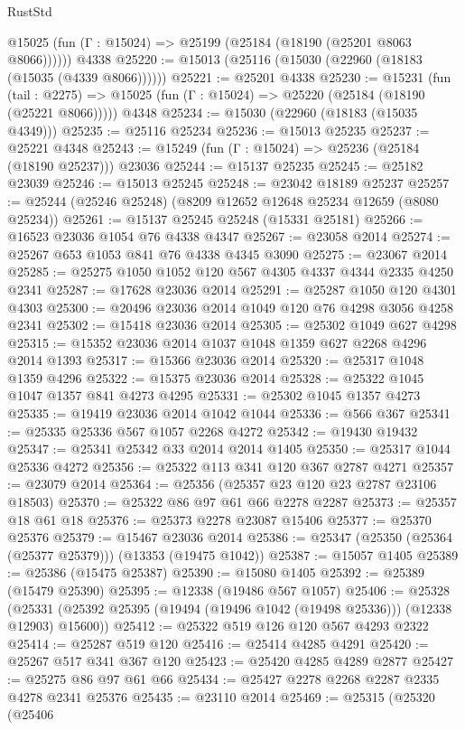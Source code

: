 \begin{lexlean}{RustStd}
\begin{coremodule}
      @15025 (fun (Γ : @15024) => @25199 (@25184 (@18190 (@25201 @8063 @8066))))))
    @4338
@25220 := @15013 (@25116 (@15030 (@22960 (@18183 (@15035 (@4339 @8066))))))
@25221 := @25201 @4338
@25230 := @15231
    (fun (tail : @2275) => @15025 (fun (Γ : @15024) => @25220 (@25184 (@18190 (@25221 @8066)))))
    @4348
@25234 := @15030 (@22960 (@18183 (@15035 @4349)))
@25235 := @25116 @25234
@25236 := @15013 @25235
@25237 := @25221 @4348
@25243 := @15249 (fun (Γ : @15024) => @25236 (@25184 (@18190 @25237))) @23036
@25244 := @15137 @25235
@25245 := @25182 @23039
@25246 := @15013 @25245
@25248 := @23042 @18189 @25237
@25257 := @25244 (@25246 @25248) (@8209 @12652 @12648 @25234 @12659 (@8080 @25234))
@25261 := @15137 @25245 @25248 (@15331 @25181)
@25266 := @16523 @23036 @1054 @76 @4338 @4347
@25267 := @23058 @2014
@25274 := @25267 @653 @1053 @841 @76 @4338 @4345 @3090
@25275 := @23067 @2014
@25285 := @25275 @1050 @1052 @120 @567 @4305 @4337 @4344 @2335 @4250 @2341
@25287 := @17628 @23036 @2014
@25291 := @25287 @1050 @120 @4301 @4303
@25300 := @20496 @23036 @2014 @1049 @120 @76 @4298 @3056 @4258 @2341
@25302 := @15418 @23036 @2014
@25305 := @25302 @1049 @627 @4298
@25315 := @15352 @23036 @2014 @1037 @1048 @1359 @627 @2268 @4296 @2014 @1393
@25317 := @15366 @23036 @2014
@25320 := @25317 @1048 @1359 @4296
@25322 := @15375 @23036 @2014
@25328 := @25322 @1045 @1047 @1357 @841 @4273 @4295
@25331 := @25302 @1045 @1357 @4273
@25335 := @19419 @23036 @2014 @1042 @1044
@25336 := @566 @367
@25341 := @25335 @25336 @567 @1057 @2268 @4272
@25342 := @19430 @19432
@25347 := @25341 @25342 @33 @2014 @2014 @1405
@25350 := @25317 @1044 @25336 @4272
@25356 := @25322 @113 @341 @120 @367 @2787 @4271
@25357 := @23079 @2014
@25364 := @25356 (@25357 @23 @120 @23 @2787 @23106 @18503)
@25370 := @25322 @86 @97 @61 @66 @2278 @2287
@25373 := @25357 @18 @61 @18
@25376 := @25373 @2278 @23087 @15406
@25377 := @25370 @25376
@25379 := @15467 @23036 @2014
@25386 := @25347 (@25350 (@25364 (@25377 @25379))) (@13353 (@19475 @1042))
@25387 := @15057 @1405
@25389 := @25386 (@15475 @25387)
@25390 := @15080 @1405
@25392 := @25389 (@15479 @25390)
@25395 := @12338 (@19486 @567 @1057)
@25406 := @25328
    (@25331 (@25392 @25395 (@19494 (@19496 @1042 (@19498 @25336))) (@12338 @12903) @15600))
@25412 := @25322 @519 @126 @120 @567 @4293 @2322
@25414 := @25287 @519 @120
@25416 := @25414 @4285 @4291
@25420 := @25267 @517 @341 @367 @120
@25423 := @25420 @4285 @4289 @2877
@25427 := @25275 @86 @97 @61 @66
@25434 := @25427 @2278 @2268 @2287 @2335 @4278 @2341 @25376
@25435 := @23110 @2014
@25469 := @25315
    (@25320
      (@25406

\end{coremodule}
\end{lexlean}
